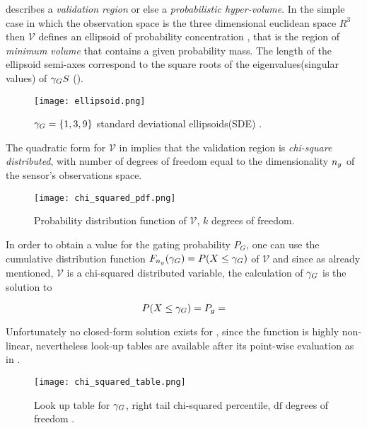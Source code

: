  describes a \emph{validation region} or else a \emph{probabilistic hyper-volume}. In the simple case in which the observation space is the three dimensional euclidean space $R^3$ then $\mathcal{V}$ defines an ellipsoid of probability concentration , that is the region of \emph{minimum volume }that contains a given probability mass. The length of the ellipsoid semi-axes correspond to the square roots of the eigenvalues(singular values) of ${\gamma_G} S$ ().

\begin{figure}[H]
	\centering
	\texttt{[image: ellipsoid.png]}
	\caption{${\gamma_G} = \{1,3,9\}$ standard deviational ellipsoids(SDE) \cite{Wang2015}.}
	\label{fig:ellipsoid}
\end{figure}


The quadratic form for $\mathcal{V}$ in  implies that the validation region is \emph{chi-square distributed}, with number of degrees of freedom equal to the dimensionality $n_{y}$ of the sensor's observations space.


\begin{figure}[H]
	\centering
	\texttt{[image: chi\_squared\_pdf.png]}
	\caption{Probability distribution function of $\mathcal{V}$, $k$ degrees of freedom.}
	\label{fig:chisquared}
\end{figure}


In order to obtain a value for the gating probability $P_G$, one can use the cumulative distribution function $F_{n_{{y}}}({\gamma_G})=P(X \leq {\gamma_G})$ of $\mathcal{V}$ and since as already mentioned, $\mathcal{V}$ is a chi-squared distributed variable, the calculation of ${\gamma_G}$ is the solution to 

\begin{equation}\label{eq:gammasol}
P(X \leq {\gamma_G}) = P_g = \end{equation}


Unfortunately no closed-form solution exists for  , since the function is highly non-linear, nevertheless look-up tables are available after its point-wise evaluation as in .





\begin{figure}[H]
	\centering
	\texttt{[image: chi\_squared\_table.png]}
	\caption{Look up table for ${\gamma_G}$, right tail chi-squared percentile, $\text{df}$ degrees of freedom .}
	\label{fig:chisquaredtable}
\end{figure}



